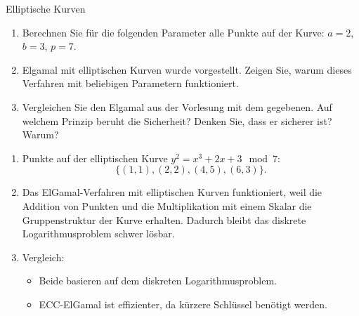 \documentclass{article}
\begin{document}
\begin{exercise}{Elliptische Kurven}
  \begin{enumerate}
    \item Berechnen Sie für die folgenden Parameter alle Punkte auf der Kurve: $a = 2$, $b = 3$, $p = 7$.
    \item Elgamal mit elliptischen Kurven wurde vorgestellt. Zeigen Sie, warum dieses Verfahren mit beliebigen Parametern funktioniert.
    \item Vergleichen Sie den Elgamal aus der Vorlesung mit dem gegebenen. Auf welchem Prinzip beruht die Sicherheit? Denken Sie, dass er sicherer ist? Warum?
  \end{enumerate}

  \begin{solution}
    \begin{enumerate}
        \item Punkte auf der elliptischen Kurve $ y^2 = x^3 + 2x + 3 \mod 7 $:
        \[
        \{(1, 1), (2, 2), (4, 5), (6, 3)\}.
        \]
        \item Das ElGamal-Verfahren mit elliptischen Kurven funktioniert, weil die Addition von Punkten und die Multiplikation mit einem Skalar die Gruppenstruktur der Kurve erhalten. Dadurch bleibt das diskrete Logarithmusproblem schwer lösbar.
        \item Vergleich:
        \begin{itemize}
            \item Beide basieren auf dem diskreten Logarithmusproblem.
            \item ECC-ElGamal ist effizienter, da kürzere Schlüssel benötigt werden.
        \end{itemize}
    \end{enumerate}
  \end{solution}
\end{exercise}
\end{document}
